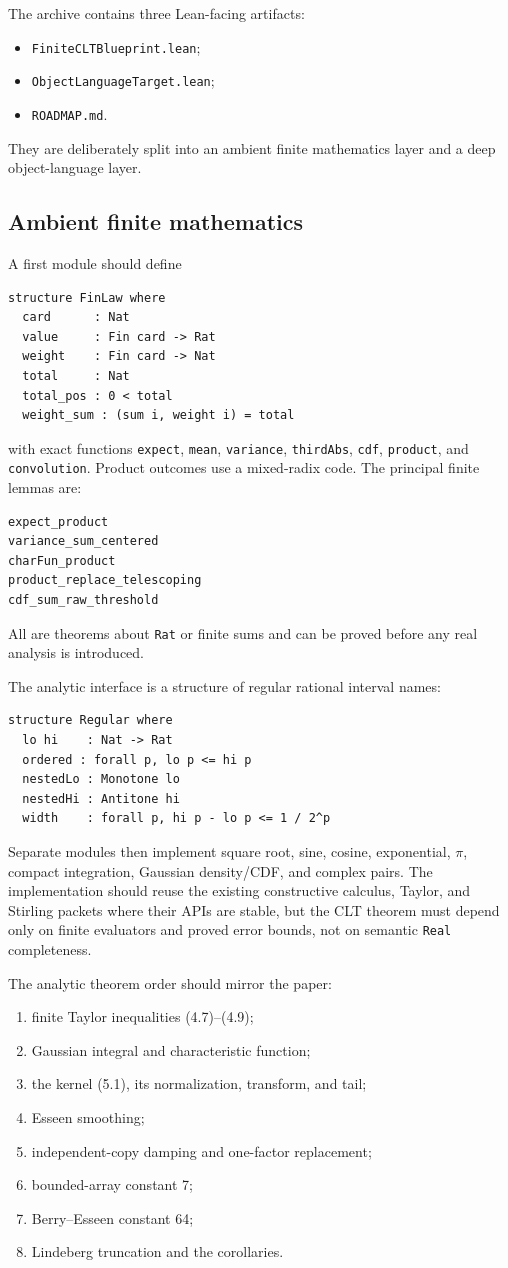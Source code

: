 \documentclass[11pt]{article}
\newcommand{\code}[1]{\nolinkurl{#1}}
\begin{document}
The archive contains three Lean-facing artifacts:
\begin{itemize}[nosep]
\item \code{FiniteCLTBlueprint.lean};
\item \code{ObjectLanguageTarget.lean};
\item \code{ROADMAP.md}.
\end{itemize}
They are deliberately split into an ambient finite mathematics layer and a
deep object-language layer.

\subsection{Ambient finite mathematics}

A first module should define
\begin{verbatim}
structure FinLaw where
  card      : Nat
  value     : Fin card -> Rat
  weight    : Fin card -> Nat
  total     : Nat
  total_pos : 0 < total
  weight_sum : (sum i, weight i) = total
\end{verbatim}
with exact functions
\code{expect}, \code{mean}, \code{variance}, \code{thirdAbs},
\code{cdf}, \code{product}, and \code{convolution}.  Product outcomes use a
mixed-radix code.  The principal finite lemmas are:
\begin{verbatim}
expect_product
variance_sum_centered
charFun_product
product_replace_telescoping
cdf_sum_raw_threshold
\end{verbatim}
All are theorems about \code{Rat} or finite sums and can be proved before any
real analysis is introduced.

The analytic interface is a structure of regular rational interval names:
\begin{verbatim}
structure Regular where
  lo hi    : Nat -> Rat
  ordered : forall p, lo p <= hi p
  nestedLo : Monotone lo
  nestedHi : Antitone hi
  width    : forall p, hi p - lo p <= 1 / 2^p
\end{verbatim}
Separate modules then implement square root, sine, cosine, exponential,
\(\pi\), compact integration, Gaussian density/CDF, and complex pairs.  The
implementation should reuse the existing constructive calculus, Taylor, and
Stirling packets where their APIs are stable, but the CLT theorem must depend
only on finite evaluators and proved error bounds, not on semantic
\code{Real} completeness.

The analytic theorem order should mirror the paper:
\begin{enumerate}
\item finite Taylor inequalities (4.7)--(4.9);
\item Gaussian integral and characteristic function;
\item the kernel (5.1), its normalization, transform, and tail;
\item Esseen smoothing;
\item independent-copy damping and one-factor replacement;
\item bounded-array constant 7;
\item Berry--Esseen constant 64;
\item Lindeberg truncation and the corollaries.
\end{enumerate}
\end{document}
